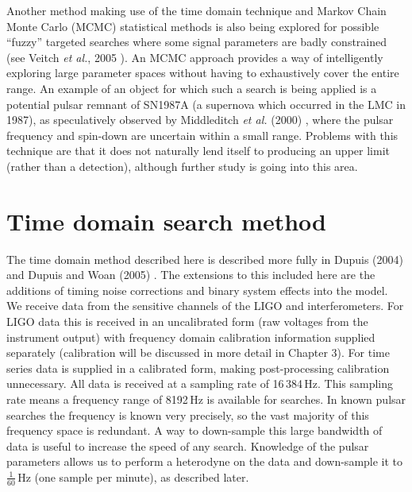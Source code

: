 Another method making use of the time domain technique and Markov Chain Monte Carlo (MCMC)
statistical methods is also being explored for possible ``fuzzy'' targeted searches where some
signal parameters are badly constrained (see Veitch {\it et al.}, 2005 \cite{Veitch:2005}). An MCMC
approach provides a way of intelligently exploring large parameter spaces without having to
exhaustively cover the entire range. An example of an object for which such a search is being
applied is a potential pulsar remnant of SN1987A (a supernova which occurred in the LMC in 1987), as
speculatively observed by Middleditch {\it et al.} (2000) \cite{Middleditch:2000}, where the pulsar
frequency and spin-down are uncertain within a small range. Problems with this technique are that it
does not naturally lend itself to producing an upper limit (rather than a detection), although
further study is going into this area.

\section{Time domain search method}\label{TimeDomainMethod}
The time domain method described here is described more fully in Dupuis (2004) and Dupuis and Woan
(2005) \cite{Dupuis:2004, DupuisWoan:2005}. The extensions to this included here are the additions
of timing noise corrections and binary system effects into the model. We receive data from the \gw
sensitive channels of the LIGO and \geo interferometers. For LIGO data this is received in an
uncalibrated form (raw voltages from the instrument output) with frequency domain calibration
information supplied separately (calibration will be discussed in more detail in Chapter 3). For
\geo time series data is supplied in a calibrated form, making post-processing calibration
unnecessary. All data is received at a sampling rate of 16\,384\,Hz. This sampling rate means a
frequency range of 8192\,Hz is available for searches. In known pulsar searches the frequency is
known very precisely, so the vast majority of this frequency space is redundant. A way to
down-sample this large bandwidth of data is useful to increase the speed of any search. Knowledge of
the pulsar parameters allows us to perform a heterodyne on the data and down-sample it to
$\frac{1}{60}$\,Hz (one sample per minute), as described later.

